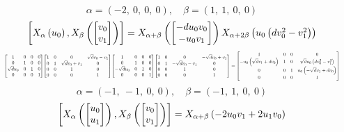 \documentclass[11pt]{article}
\theoremstyle{definition}
\begin{document}
\[
\alpha = \left( -2, \  0, \  0, \  0\right), \quad \beta = \left( 1, \  1, \  0, \  0\right)
\]
\[
\scaletoalign{\textwidth}{\left[ X_{\alpha}\left(u_{0}\right), X_{\beta}\left(\left[\begin{matrix}v_{0}\\v_{1}\end{matrix}\right]\right) \right] = X_{\alpha + \beta}\left(\left[\begin{matrix}- d u_{0} v_{0}\\- u_{0} v_{1}\end{matrix}\right]\right) X_{\alpha + 2\beta}\left(u_{0} \left(d v_{0}^{2} - v_{1}^{2}\right)\right)}
\]
\[
\scaletoalign{\textwidth}{{\left[\begin{matrix}1 & 0 & 0 & 0\\0 & 1 & 0 & 0\\\sqrt{d} u_{0} & 0 & 1 & 0\\0 & 0 & 0 & 1\end{matrix}\right]} {\left[\begin{matrix}1 & 0 & 0 & \sqrt{d} v_{0} - v_{1}\\0 & 1 & \sqrt{d} v_{0} + v_{1} & 0\\0 & 0 & 1 & 0\\0 & 0 & 0 & 1\end{matrix}\right]} {\left[\begin{matrix}1 & 0 & 0 & 0\\0 & 1 & 0 & 0\\- \sqrt{d} u_{0} & 0 & 1 & 0\\0 & 0 & 0 & 1\end{matrix}\right]} {\left[\begin{matrix}1 & 0 & 0 & - \sqrt{d} v_{0} + v_{1}\\0 & 1 & - \sqrt{d} v_{0} - v_{1} & 0\\0 & 0 & 1 & 0\\0 & 0 & 0 & 1\end{matrix}\right]} = {\left[\begin{matrix}1 & 0 & 0 & 0\\- u_{0} \left(\sqrt{d} v_{1} + d v_{0}\right) & 1 & 0 & \sqrt{d} u_{0} \left(d v_{0}^{2} - v_{1}^{2}\right)\\0 & 0 & 1 & u_{0} \left(- \sqrt{d} v_{1} + d v_{0}\right)\\0 & 0 & 0 & 1\end{matrix}\right]}}
\]
\[
\alpha = \left( -1, \  -1, \  0, \  0\right), \quad \beta = \left( -1, \  1, \  0, \  0\right)
\]
\[
\scaletoalign{\textwidth}{\left[ X_{\alpha}\left(\left[\begin{matrix}u_{0}\\u_{1}\end{matrix}\right]\right), X_{\beta}\left(\left[\begin{matrix}v_{0}\\v_{1}\end{matrix}\right]\right) \right] = X_{\alpha + \beta}\left(- 2 u_{0} v_{1} + 2 u_{1} v_{0}\right)}
\]
\end{document}
